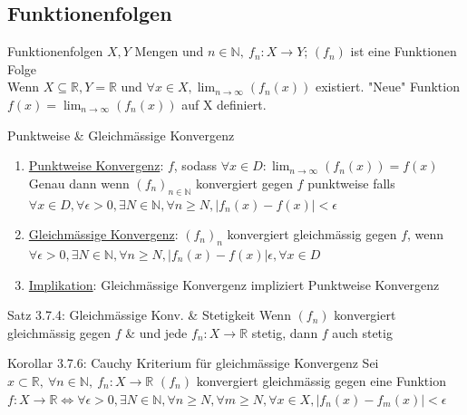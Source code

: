 \documentclass[a4paper,10pt]{article}
\begin{document}
\subsection{Funktionenfolgen}
\begin{defbox}
    {Funktionenfolgen}
    $X,Y$ Mengen und $n\in\mathbb N,\ f_n:X\longrightarrow Y$; $(f_n)$ ist eine Funktionen Folge
    \\ Wenn $X\subseteq\mathbb R, Y=\mathbb R$ und $\forall x\in X,\lim_{n\to\infty}(f_n(x))$ existiert. "Neue" Funktion $f(x)=\lim_{n\to\infty}(f_n(x))$ auf X definiert.
\end{defbox}
\begin{defbox}
    {Punktweise \& Gleichmässige Konvergenz}
    \begin{enumerate}
        \item \underline{Punktweise Konvergenz}: $f$, sodass $\forall x\in D:\lim_{n\to \infty}(f_n(x))=f(x)$
        \\ Genau dann wenn $(f_n)_{n\in\mathbb N}$ konvergiert gegen $f$ punktweise falls $\forall x\in D, \forall \epsilon>0,\exists N \in \mathbb N, \forall n \ge N, |f_n(x)-f(x)|<\epsilon$
        \item \underline{Gleichmässige Konvergenz}: $(f_n)_n$ konvergiert gleichmässig gegen $f$, wenn $\forall \epsilon>0,\exists N \in \mathbb N, \forall n \ge N, |f_n(x)-f(x)|\epsilon, \forall x\in D$
        \item \underline{Implikation}: Gleichmässige Konvergenz impliziert Punktweise Konvergenz
    \end{enumerate}
\end{defbox}
\begin{tbox}
    {Satz 3.7.4: Gleichmässige Konv. \& Stetigkeit}
    Wenn $(f_n)$ konvergiert gleichmässig gegen $f$ \& und jede $f_n:X\longrightarrow \mathbb R$ stetig, dann $f$ auch stetig
\end{tbox}
\begin{tbox}
    {Korollar 3.7.6: Cauchy Kriterium für gleichmässige Konvergenz}
    Sei $x\subset \mathbb R, \ \forall n \in \mathbb N,\ f_n:X\longrightarrow \mathbb R$
    $(f_n)$ konvergiert gleichmässig gegen eine Funktion $f:X\longrightarrow \mathbb R \iff \forall \epsilon>0, \exists N \in \mathbb N, \forall n\ge N, \forall m \ge N, \forall x \in X, |f_n(x)-f_m(x)| < \epsilon$
\end{tbox}
\end{document}
